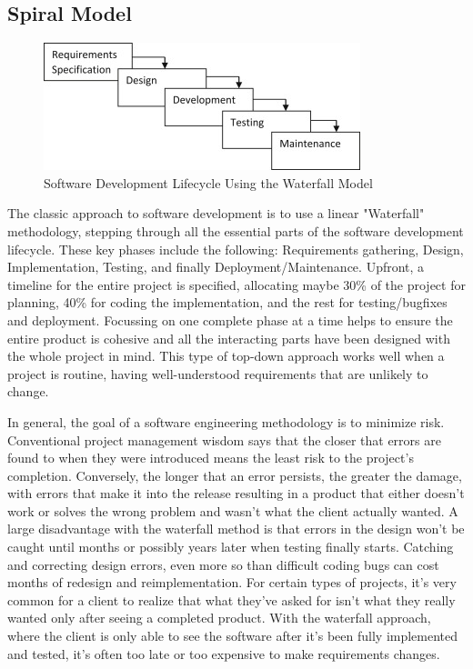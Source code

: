 \documentclass[12pt,a4paper,twoside,openright]{report}
\begin{document}
\subsection{Spiral Model}
\begin{figure}[tbh]
\centerline{\includegraphics{waterfall}}
\caption{Software Development Lifecycle Using the Waterfall Model}
\label{waterfallfig}
\end{figure}
The classic approach to software development is to use a linear "Waterfall" methodology, stepping through all the essential parts of the software development lifecycle.
These key phases include the following: Requirements gathering, Design, Implementation, Testing, and finally Deployment/Maintenance.
Upfront, a timeline for the entire project is specified, allocating maybe 30\% of the project for planning, 40\% for coding the implementation, and the rest for testing/bugfixes and deployment.
Focussing on one complete phase at a time helps to ensure the entire product is cohesive and all the interacting parts have been designed with the whole project in mind.
This type of top-down approach works well when a project is routine, having well-understood requirements that are unlikely to change.

In general, the goal of a software engineering methodology is to minimize risk.
Conventional project management wisdom says that the closer that errors are found to when they were introduced means the least risk to the project's completion.
Conversely, the longer that an error persists, the greater the damage, with errors that make it into the release resulting in a product that either doesn't work or solves the wrong problem and wasn't what the client actually wanted.
A large disadvantage with the waterfall method is that errors in the design won't be caught until months or possibly years later when testing finally starts.
Catching and correcting design errors, even more so than difficult coding bugs can cost months of redesign and reimplementation.
For certain types of projects, it's very common for a client to realize that what they've asked for isn't what they really wanted only after seeing a completed product.
With the waterfall approach, where the client is only able to see the software after it's been fully implemented and tested, it's often too late or too expensive to make requirements changes.
\end{document}
